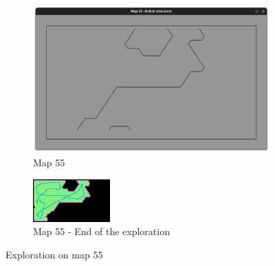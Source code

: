 \documentclass[../main.tex]{subfiles}
\begin{document}
\begin{figure}[H]
	\centering
	\begin{subfigure}{0.45\textwidth}
		\centering
		\includegraphics[width=\textwidth]{IMAGES/part5/map55.png}
		\caption{Map 55}
	\end{subfigure}
	\hfill
	\begin{subfigure}{0.45\textwidth}
		\centering
		\includegraphics[width=\textwidth]{IMAGES/part5/map55_explored_2robot.png}
		\caption{Map 55 - End of the exploration}
	\end{subfigure}
	\caption{Exploration on map 55}
	\label{fig:explo_55}
\end{figure}
\end{document}
